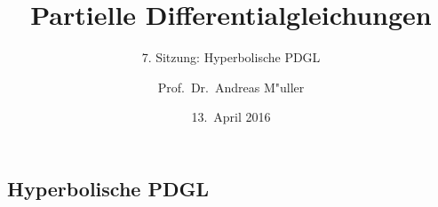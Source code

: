 \documentclass[handout]{beamer}
\title[]{Partielle Differentialgleichungen}
\subtitle{7. Sitzung: Hyperbolische PDGL}
\date[13.~April 2016]{13.~April 2016}
\author{Prof.~Dr.~Andreas M"uller}
\begin{document}
\begin{frame}
\section{Hyperbolische PDGL}
\titlepage

\end{frame}


\end{document}
